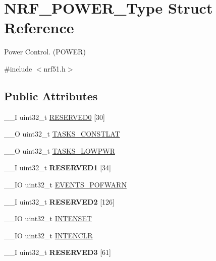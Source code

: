 \hypertarget{struct_n_r_f___p_o_w_e_r___type}{}\section{N\+R\+F\+\_\+\+P\+O\+W\+E\+R\+\_\+\+Type Struct Reference}
\label{struct_n_r_f___p_o_w_e_r___type}


Power Control. (P\+O\+W\+E\+R)  




{\ttfamily \#include $<$nrf51.\+h$>$}

\subsection*{Public Attributes}
\begin{DoxyCompactItemize}
\item 
\+\_\+\+\_\+\+I uint32\+\_\+t \hyperlink{struct_n_r_f___p_o_w_e_r___type_a9bbaef719705f75e1ee085d7028b2b14}{R\+E\+S\+E\+R\+V\+E\+D0} \mbox{[}30\mbox{]}
\item 
\+\_\+\+\_\+\+O uint32\+\_\+t \hyperlink{struct_n_r_f___p_o_w_e_r___type_a4fea8c0736739a7a7501553af857dbb5}{T\+A\+S\+K\+S\+\_\+\+C\+O\+N\+S\+T\+L\+A\+T}
\item 
\+\_\+\+\_\+\+O uint32\+\_\+t \hyperlink{struct_n_r_f___p_o_w_e_r___type_a73c2db8f3896ab3a0581388e418577a2}{T\+A\+S\+K\+S\+\_\+\+L\+O\+W\+P\+W\+R}
\item 
\hypertarget{struct_n_r_f___p_o_w_e_r___type_a42124a39dcec50b9d2e0079fe7307ef2}{}\+\_\+\+\_\+\+I uint32\+\_\+t {\bfseries R\+E\+S\+E\+R\+V\+E\+D1} \mbox{[}34\mbox{]}\label{struct_n_r_f___p_o_w_e_r___type_a42124a39dcec50b9d2e0079fe7307ef2}

\item 
\+\_\+\+\_\+\+I\+O uint32\+\_\+t \hyperlink{struct_n_r_f___p_o_w_e_r___type_a557ed34de159813b92d3b627cf77fca6}{E\+V\+E\+N\+T\+S\+\_\+\+P\+O\+F\+W\+A\+R\+N}
\item 
\hypertarget{struct_n_r_f___p_o_w_e_r___type_ad3d392686936420ed4f2c274f73e42d9}{}\+\_\+\+\_\+\+I uint32\+\_\+t {\bfseries R\+E\+S\+E\+R\+V\+E\+D2} \mbox{[}126\mbox{]}\label{struct_n_r_f___p_o_w_e_r___type_ad3d392686936420ed4f2c274f73e42d9}

\item 
\+\_\+\+\_\+\+I\+O uint32\+\_\+t \hyperlink{struct_n_r_f___p_o_w_e_r___type_a9d4e03e33a7dd0a14c4980ca66ab69ee}{I\+N\+T\+E\+N\+S\+E\+T}
\item 
\+\_\+\+\_\+\+I\+O uint32\+\_\+t \hyperlink{struct_n_r_f___p_o_w_e_r___type_a82131597cbcc2f0831af47da96542063}{I\+N\+T\+E\+N\+C\+L\+R}
\item 
\hypertarget{struct_n_r_f___p_o_w_e_r___type_abf62ac98a912545c5ad9790e2ed41c25}{}\+\_\+\+\_\+\+I uint32\+\_\+t {\bfseries R\+E\+S\+E\+R\+V\+E\+D3} \mbox{[}61\mbox{]}\label{struct_n_r_f___p_o_w_e_r___type_abf62ac98a912545c5ad9790e2ed41c25}


\end{DoxyCompactItemize}
